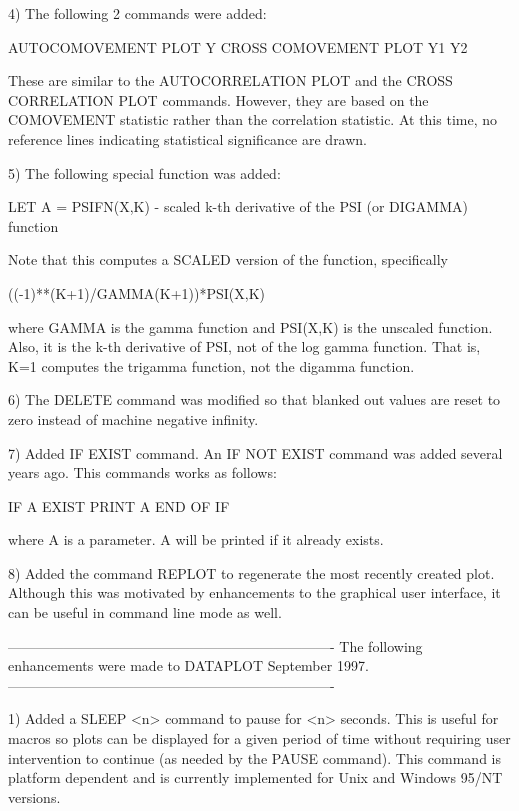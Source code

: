 { 4) The following 2 commands were added:

       AUTOCOMOVEMENT PLOT Y
       CROSS COMOVEMENT PLOT Y1 Y2

    These are similar to the AUTOCORRELATION PLOT and the
    CROSS CORRELATION PLOT commands.  However, they are based
    on the COMOVEMENT statistic rather than the correlation
    statistic.   At this time, no reference lines indicating
    statistical significance are drawn.

 5) The following special function was added:

       LET A = PSIFN(X,K)  - scaled k-th derivative of the PSI (or
                             DIGAMMA) function

    Note that this computes a SCALED version of the function,
    specifically

       ((-1)**(K+1)/GAMMA(K+1))*PSI(X,K)

    where GAMMA is the gamma function and PSI(X,K) is the unscaled
    function.  Also, it is the k-th derivative of PSI, not of
    the log gamma function.  That is, K=1 computes the 
    trigamma function, not the digamma function.

 6) The DELETE command was modified so that blanked out values
    are reset to zero instead of machine negative infinity.

 7) Added IF EXIST command.  An IF NOT EXIST command was added
    several years ago.  This commands works as follows:

       IF A EXIST
         PRINT A
       END OF IF

    where A is a parameter.  A will be printed if it already
    exists.

 8) Added the command REPLOT to regenerate the most recently
    created plot.  Although this was motivated by enhancements
    to the graphical user interface, it can be useful in command
    line mode as well.

----------------------------------------------------------------------
The following enhancements were made to DATAPLOT September       1997.
----------------------------------------------------------------------

 1) Added a SLEEP <n> command to pause for <n> seconds.  This is useful for
    macros so plots can be displayed for a given period of time without
    requiring user intervention to continue (as needed by the PAUSE command).
    This command is platform dependent and is currently implemented for Unix
    and Windows 95/NT versions.

}
